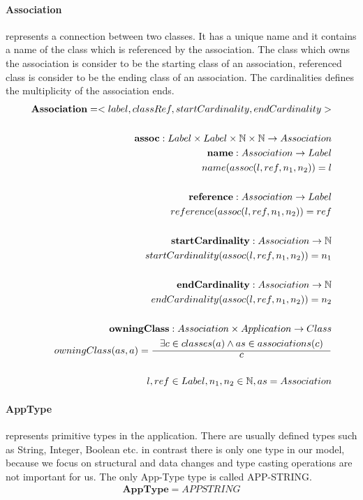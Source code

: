 \documentclass[11pt]{article}
\begin{document}
\paragraph {Association} represents a connection between two classes. It has a unique name and it contains a name of the class which is referenced by the association. The class which owns the association is consider to be the starting class of an association, referenced class is consider to be the ending class of an association. The cardinalities defines the multiplicity of the association ends.
\begin{align*}
	\mathbf{Association} = <label, classRef, startCardinality, endCardinality> \\ \\
	\mathbf{assoc} : Label \times Label \times \mathbb{N} \times \mathbb{N} \rightarrow Association\\
	\mathbf{name} : Association \rightarrow Label \\
	name(assoc(l, ref, n_1, n_2)) = l\\ \\
	\mathbf{reference} : Association \rightarrow Label \\
	reference(assoc(l, ref, n_1, n_2)) = ref\\ \\
	\mathbf{startCardinality} : Association \rightarrow \mathbb{N} \\
	startCardinality(assoc(l, ref, n_1, n_2)) = n_1\\ \\
	\mathbf{endCardinality} : Association \rightarrow \mathbb{N} \\
	endCardinality(assoc(l, ref, n_1, n_2)) = n_2 \\ \\
	\mathbf{owningClass} : Association \times Application \rightarrow Class  \\
	owningClass(as, a) = \inference{\exists c \in classes(a) \wedge as \in associations(c)}{c}  \\ \\	
	l, ref \in Label,  n_1, n_2 \in \mathbb{N}, as = Association
\end{align*}



\paragraph{AppType} represents primitive types in the application. There are usually defined types such as String, Integer, Boolean etc. in contrast there is only one type in our model, because we focus on structural and data changes and type casting operations are not important for us. The only App-Type type is called APP-STRING.
\begin{align*}
\mathbf{AppType} = APPSTRING
\end{align*}
\end{document}
